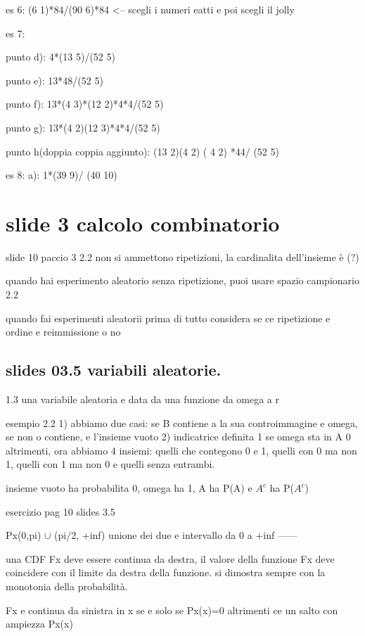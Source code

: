\documentclass[12pt]{article}
\begin{document}
        es 6:
        (6 1)*84/(90 6)*84 <-- scegli i numeri eatti e poi scegli il jolly

        es 7:

        punto d):
        4*(13 5)/(52 5)
          
punto e):
 13*48/(52 5)

punto f):
 13*(4 3)*(12 2)*4*4/(52 5)


punto g):
 13*(4 2)(12 3)*4*4/(52 5)

punto h(doppia coppia aggiunto):
(13 2)(4 2) ( 4 2) *44/ (52 5)

es 8:
a):
1*(39 9)/ (40 10)

\section{slide 3 calcolo combinatorio}

slide 10 paccio 3 2.2 non si ammettono ripetizioni, la cardinalita dell'insieme è (?)

quando hai esperimento aleatorio senza ripetizione, puoi usare spazio campionario 2.2

quando fai esperimenti aleatorii prima di tutto considera se ce ripetizione e ordine e reimmissione o no



\subsection{slides 03.5 variabili aleatorie.}

1.3 una variabile aleatoria e data da una funzione da omega  a r

esempio 2.2 1) abbiamo due casi: se B contiene a la sua controimmagine e omega, se non o contiene, e l'insieme vuoto
2) indicatrice definita 1 se  omega sta in A 0 altrimenti, ora abbiamo 4 insiemi: quelli che contegono 0 e 1, quelli con 0 ma non 1, quelli con 1 ma non 0 e quelli senza entrambi.

insieme vuoto ha probabilita 0, omega ha 1, A ha P(A) e $A^c$ ha P($A^c$)

esercizio pag 10 slides 3.5

Px(0,pi) $\cup$ (pi/2, +inf)
unione dei due e intervallo da 0 a +inf
------

una CDF Fx deve essere continua da destra, il valore della funzione Fx deve coincidere con il limite da destra della funzione.
si dimostra sempre con la monotonia della probabilità.

Fx e continua da sinistra in x se e solo se Px({x})=0 altrimenti ce un salto con ampiezza Px({x})
\end{document}
